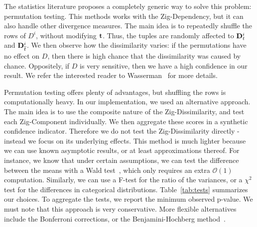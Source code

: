 The statistics literature proposes a completely ge\-ne\-ric way to solve
this problem: permutation testing. This methods works with the Zig-Dependency,
but it can also handle other divergence measures. The main idea is to
repeatedly shuffle the rows of $D^i$, without modifying $\mathbf{t}$. Thus, the
tuples are randomly affected to $\mathbf{D}^i_t$ and $\mathbf{D}^i_{\overline{t}}$. We
then observe how the dissimilarity varies: if the permutations have no
effect on $D$, then there is high chance that the dissimilarity was caused by
chance.  Oppositely, if $D$ is very sensitive,
then we have a high confidence in our result. We refer the interested
reader to Wasserman~\cite{wasserman2013all} for more details.

Permutation testing offers plenty of advantages, but shuffling the rows is
computationally heavy. In our implementation, we used an alternative approach.
The main idea is to use the composite nature of the Zig-Dissimilarity, and test
each Zig-Component individually. We then aggregate these scores in a synthetic
confidence indicator. Therefore we do not test the Zig-Dissimilarity directly -
instead we focus on its underlying effects.  This method is much lighter
because we can use known asymptotic results, or at least approximations
thereof. For instance, we know that under certain assumptions, we can test the
difference between the means with a Wald test~\cite{wasserman2013all}, which
only requires an extra $\mathcal{O}(1)$ computation.  Similarly, we can use a
F-test for the ratio of the variances, or a $\chi^2$ test for the differences
in categorical distributions.  Table~\ref{tab:tests} summarizes our choices. 
To aggregate the tests, we report the minimum observed p-value. We must note
that this approach is very conservative. More flexible alternatives include
the Bonferroni corrections, or the Benjamini-Hochberg
method~\cite{wasserman2013all}.

